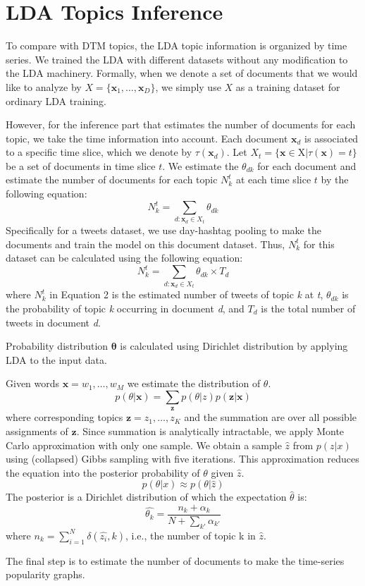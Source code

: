 \chapter{LDA Topics Inference}
To compare with DTM topics, the LDA topic information is organized by time series. We trained the LDA with different datasets without any modification to the LDA machinery.
Formally, when we denote a set of documents that we would like to analyze by $X = \{\mathbf{x}_1, \dots, \mathbf{x}_D\}$, we simply use $X$ as a training dataset for ordinary LDA training.

However, for the inference part that estimates the number of documents for each topic, we take the time information into account.
Each document $\mathbf{x}_d$ is associated to a specific time slice, which we denote by $\tau(\mathbf{x}_d)$.
Let $X_t = \{ \mathbf{x} \in $X$ | \tau(\mathbf{x}) =  t \}$ be a set of documents in time slice $t$.
We estimate the $\theta_{dk}$ for each document and estimate the number of documents for each topic $N_k^t$ at each time slice $t$ by the following equation:
\begin{equation}
N_k^t = \sum_{d: \mathbf{x}_d \in X_t} {\theta}_{dk}
\end{equation}
Specifically for a tweets dataset, we use day-hashtag pooling to make the documents and train the model on this document dataset. Thus, $N_k^t$ for this dataset can be calculated using the following equation:
\begin{equation}
N_k^t = \sum_{d: \mathbf{x}_d \in X_t} \theta_{dk} \times T_d
\end{equation}
where $N_k^t$ in Equation 2 is the estimated number of tweets of topic \textit{k} at \textit{t}, $\theta_{dk}$ is the probability of topic \textit{k} occurring in document \textit{d}, and $T_d$ is the total number of tweets in document \textit{d}.

Probability distribution $\mathbf{\theta}$ is calculated using Dirichlet distribution by applying LDA to the input data.

Given words $ \mathbf{x} = w_1, \dots , w_M$ we estimate the distribution of $\theta$.
\begin{equation}
p(\theta|\mathbf{x}) = \sum_\mathbf{z} p(\theta|z)p(\mathbf{z}|\mathbf{x})
\end{equation}
where corresponding topics $\mathbf{z} = z_1, \dots, z_K$ and the summation are over all possible assignments of $\mathbf{z}$. Since summation is analytically intractable, we apply Monte Carlo approximation with only one sample. We obtain a sample $ \hat{z} $ from $ p(z|x) $ using (collapsed) Gibbs sampling with five iterations. This approximation reduces the equation into the posterior probability of $ \theta $ given $ \hat{z} $.
\begin{equation}
p(\theta|x) \approx p(\theta|\hat{z})
\end{equation}
The posterior is a Dirichlet distribution of which the expectation $\hat{\theta}$ is:
\begin{equation}
\hat{\theta_k} = \frac{n_k + \alpha_k}{N + \sum_{k'} \alpha_{k'}}
\end{equation}
where $ n_k = \sum_{i=1}^N \delta(\hat{z_i}, k) $, i.e., the number of topic k in $\hat{z}$.

The final step is to estimate the number of documents to make the time-series popularity graphs.